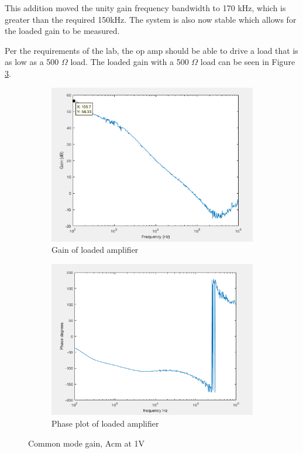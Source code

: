 	This addition moved the unity gain frequency bandwidth to 170 kHz, which is greater than the required 150kHz. The system is also now stable which allows for the loaded gain to be measured.
		
		
		 Per the requirements of the lab, the op amp should be able to drive a load that is as low as a 500 $\Omega$ load. The loaded gain with a 500 $\Omega$ load can be seen in Figure \ref{fig:gainwithload}.
				
		
	
	
	\begin{figure}[H]
		\centering
		\begin{subfigure}[b]{0.45\textwidth}
			\centering
			\includegraphics[scale=.40]{ExperimentalImplementation/gainwithload.png}
		\caption{Gain of loaded amplifier}
		\label{fig:tload}
		\end{subfigure}
		\hfill
		\begin{subfigure}[b]{0.45\textwidth}
			\centering
			\includegraphics[scale=.40]{ExperimentalImplementation/phasewithload.png}
		\caption{Phase plot of loaded amplifier}
		\label{fig:phasewithload}
		\end{subfigure}
		\caption{Common mode gain, Acm at 1V}
		\label{fig:gainwithload}
	\end{figure} 
	
